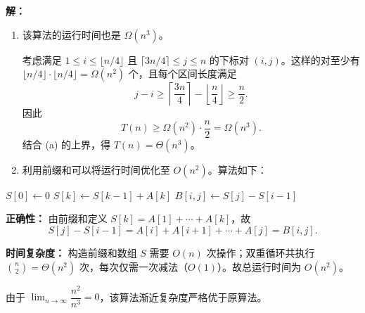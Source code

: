\documentclass[12pt]{article}
\newenvironment{solution}{\par\noindent\textbf{解：}\par}{\par}
\begin{document}
\begin{enumerate}
\begin{solution}
\begin{enumerate}
            \item 该算法的运行时间也是 $\Omega(n^3)$。

            考虑满足 $1 \leq i \leq \lfloor n/4 \rfloor$ 且 $\lceil 3n/4 \rceil \leq j \leq n$ 的下标对 $(i, j)$。这样的对至少有 $\lfloor n/4 \rfloor \cdot \lfloor n/4 \rfloor = \Omega(n^2)$ 个，且每个区间长度满足
            $$
                j - i \geq \left\lceil \frac{3n}{4} \right\rceil - \left\lfloor \frac{n}{4} \right\rfloor \geq \frac{n}{2}.
            $$
            因此
            $$
                T(n) \geq \Omega(n^2) \cdot \frac{n}{2} = \Omega(n^3).
            $$
            结合 (a) 的上界，得 $T(n) = \Theta(n^3)$。

            \item 利用前缀和可以将运行时间优化至 $O(n^2)$。算法如下：

        \end{enumerate}

        \begin{algorithmic}
            \State $S[0] \gets 0$
                \State $S[k] \gets S[k-1] + A[k]$
            \EndFor
                    \State $B[i, j] \gets S[j] - S[i-1]$
                \EndFor
            \EndFor
        \end{algorithmic}

        \textbf{正确性：} 由前缀和定义 $S[k] = A[1] + \cdots + A[k]$，故
        $$
            S[j] - S[i-1] = A[i] + A[i+1] + \cdots + A[j] = B[i,j].
        $$

        \textbf{时间复杂度：} 构造前缀和数组 $S$ 需要 $O(n)$ 次操作；双重循环共执行 $\binom{n}{2} = \Theta(n^2)$ 次，每次仅需一次减法（$O(1)$）。故总运行时间为 $O(n^2)$。

        由于 $\lim_{n \to \infty} \dfrac{n^2}{n^3} = 0$，该算法渐近复杂度严格优于原算法。

    \end{solution}
\end{enumerate}
\end{document}
